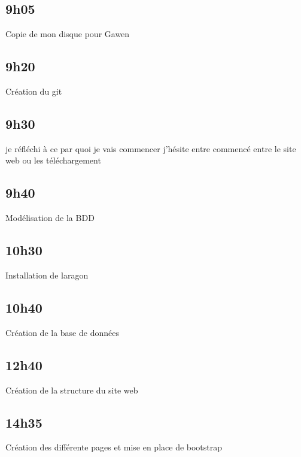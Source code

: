 \documentclass[a4paper,12pt,french]{sphinxmanual}
\begin{document}
\subsection{9h05}
\label{\detokenize{logbook:id2}}
\sphinxAtStartPar
Copie de mon disque pour Gawen


\subsection{9h20}
\label{\detokenize{logbook:h20}}
\sphinxAtStartPar
Création du git


\subsection{9h30}
\label{\detokenize{logbook:h30}}
\sphinxAtStartPar
je réfléchi à ce par quoi je vais commencer j’hésite entre commencé entre le site web ou les téléchargement


\subsection{9h40}
\label{\detokenize{logbook:h40}}
\sphinxAtStartPar
Modélisation de la BDD

\sphinxAtStartPar
{}


\subsection{10h30}
\label{\detokenize{logbook:id3}}
\sphinxAtStartPar
Installation de laragon


\subsection{10h40}
\label{\detokenize{logbook:id4}}
\sphinxAtStartPar
Création de la base de données


\subsection{12h40}
\label{\detokenize{logbook:id5}}
\sphinxAtStartPar
Création de la structure du site web


\subsection{14h35}
\label{\detokenize{logbook:h35}}
\sphinxAtStartPar
Création des différente pages et mise en place de bootstrap
\end{document}
